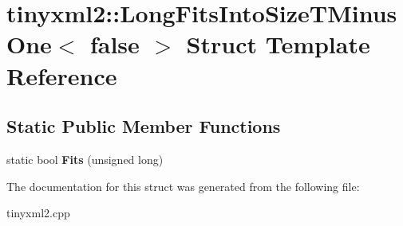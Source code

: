 \hypertarget{structtinyxml2_1_1_long_fits_into_size_t_minus_one_3_01false_01_4}{}\section{tinyxml2\+:\+:Long\+Fits\+Into\+Size\+T\+Minus\+One$<$ false $>$ Struct Template Reference}
\label{structtinyxml2_1_1_long_fits_into_size_t_minus_one_3_01false_01_4}
\subsection*{Static Public Member Functions}
\begin{DoxyCompactItemize}
\item 
\mbox{\label{structtinyxml2_1_1_long_fits_into_size_t_minus_one_3_01false_01_4_a29b01087f38a951276df69d358dc0764}} 
static bool {\bfseries Fits} (unsigned long)
\end{DoxyCompactItemize}


The documentation for this struct was generated from the following file\+:\begin{DoxyCompactItemize}
\item 
tinyxml2.\+cpp\end{DoxyCompactItemize}
